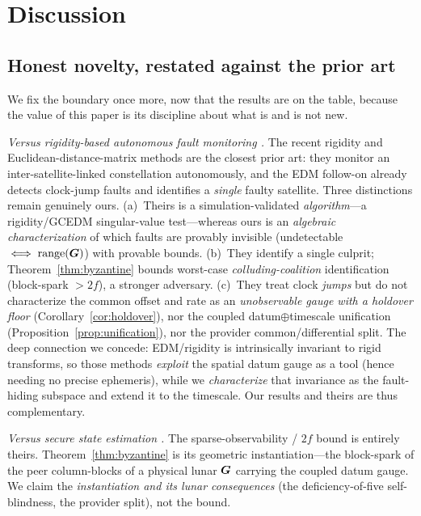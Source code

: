\section{Discussion}
\label{sec:discussion}

\subsection{Honest novelty, restated against the prior art}
\label{sec:novelty}

We fix the boundary once more, now that the results are on the table, because the value of
this paper is its discipline about what is and is not new.

\emph{Versus rigidity-based autonomous fault monitoring \citep{iiyama2024,iiyama2025edm}.} The
recent rigidity and Euclidean-distance-matrix methods are the closest prior art: they monitor
an inter-satellite-linked constellation autonomously, and the EDM follow-on already detects
clock-jump faults and identifies a \emph{single} faulty satellite. Three distinctions remain
genuinely ours. (a)~Theirs is a simulation-validated \emph{algorithm}---a rigidity/GCEDM
singular-value test---whereas ours is an \emph{algebraic characterization} of which faults are
provably invisible (undetectable $\iff\operatorname{range}(\bm{G})$) with provable bounds. (b)~They identify a
single culprit; Theorem~\ref{thm:byzantine} bounds worst-case \emph{colluding-coalition}
identification (block-spark $>2f$), a stronger adversary. (c)~They treat clock \emph{jumps} but
do not characterize the common offset and rate as an \emph{unobservable gauge with a holdover
floor} (Corollary~\ref{cor:holdover}), nor the coupled datum$\oplus$timescale unification
(Proposition~\ref{prop:unification}), nor the provider common/differential split. The deep
connection we concede: EDM/rigidity is intrinsically invariant to rigid transforms, so those
methods \emph{exploit} the spatial datum gauge as a tool (hence needing no precise ephemeris),
while we \emph{characterize} that invariance as the fault-hiding subspace and extend it to the
timescale. Our results and theirs are thus complementary.

\emph{Versus secure state estimation \citep{fawzi2014,shoukry2016,candes2005,donoho2003}.} The
sparse-observability / $2f$ bound is entirely theirs. Theorem~\ref{thm:byzantine} is its
geometric instantiation---the block-spark of the peer column-blocks of a physical lunar
$\bm{G}$ carrying the coupled datum gauge. We claim the \emph{instantiation and its lunar
consequences} (the deficiency-of-five self-blindness, the provider split), not the bound.

